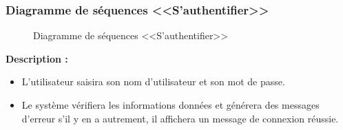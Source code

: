 \documentclass[12pt]{report}
\begin{document}
\newpage

\subsubsection{Diagramme de séquences <<S'authentifier>>}

\begin{figure}[h]
\centering
    \centerline{}
    \caption{Diagramme de séquences <<S'authentifier>>}
\end{figure}

\vspace{0.3in}

\textbf{Description :}

\begin{itemize}
    \item L'utilisateur saisira son nom d'utilisateur et son mot de passe.
    \item Le système vérifiera les informations données et générera des messages d'erreur s'il y en a autrement, il affichera un message de connexion réussie.
\end{itemize}
\end{document}
